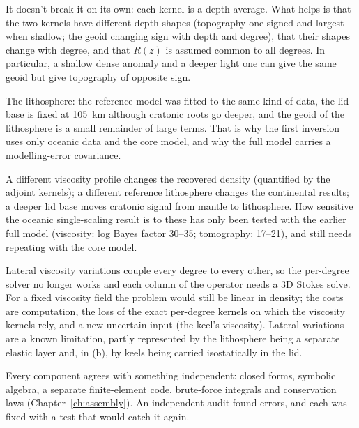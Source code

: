 \A It doesn't break it on its own: each kernel is a depth average.
What helps is that the two kernels have different depth shapes (topography one-signed and largest when shallow; the geoid changing sign with depth and degree), that their shapes change with degree, and that $R(z)$ is assumed common to all degrees.
In particular, a shallow dense anomaly and a deeper light one can give the same geoid but give topography of opposite sign.

\A The lithosphere: the reference model was fitted to the same kind of data, the lid base is fixed at \qty{105}{km} although cratonic roots go deeper, and the geoid of the lithosphere is a small remainder of large terms.
That is why the first inversion uses only oceanic data and the core model, and why the full model carries a modelling-error covariance.

\A A different viscosity profile changes the recovered density (quantified by the adjoint kernels); a different reference lithosphere changes the continental results; a deeper lid base moves cratonic signal from mantle to lithosphere.
How sensitive the oceanic single-scaling result is to these has only been tested with the earlier full model (viscosity: log Bayes factor 30--35; tomography: 17--21), and still needs repeating with the core model.

\A Lateral viscosity variations couple every degree to every other, so the per-degree solver no longer works and each column of the operator needs a 3D Stokes solve.
For a fixed viscosity field the problem would still be linear in density; the costs are computation, the loss of the exact per-degree kernels on which the viscosity kernels rely, and a new uncertain input (the keel's viscosity).
Lateral variations are a known limitation, partly represented by the lithosphere being a separate elastic layer and, in (b), by keels being carried isostatically in the lid.

\A Every component agrees with something independent: closed forms, symbolic algebra, a separate finite-element code, brute-force integrals and conservation laws (Chapter~\ref{ch:assembly}).
An independent audit found errors, and each was fixed with a test that would catch it again.

